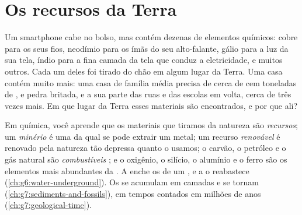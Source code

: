 \chapter{Os recursos da Terra}\label{ch:g9:earth-resources}

Um smartphone cabe no bolso, mas contém dezenas de elementos químicos:
cobre para os seus fios, neodímio para os ímãs do seu alto-falante, gálio
para a luz da sua tela, índio para a fina camada da tela que conduz a
eletricidade, e muitos outros. Cada um deles foi tirado do chão
em algum lugar da Terra. Uma casa contém muito mais: uma casa de família
média precisa de cerca de cem toneladas de ,  e pedra
britada, e a sua parte das ruas e das escolas em volta, cerca de três
vezes mais. Em que lugar da Terra esses materiais são encontrados, e por
que ali?

\begin{recall}
Em química, você aprende que os materiais que tiramos da natureza são
\emph{recursos}; um \emph{minério} é uma  da qual se pode extrair um
metal; um recurso \emph{renovável} é renovado pela natureza tão depressa
quanto o usamos; o carvão, o petróleo e o gás natural são
\emph{combustíveis }; e o oxigênio, o silício, o alumínio e o ferro
são os elementos mais abundantes da . A  enche os
 de um , e a  o reabastece
(\cref{ch:g6:water-underground}). Os  se acumulam em camadas e
se tornam  (\cref{ch:g7:sediments-and-fossils}), em
tempos contados em milhões de anos (\cref{ch:g7:geological-time}).
\end{recall}

